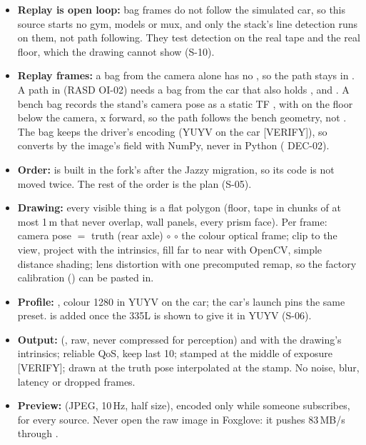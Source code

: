 \documentclass[11pt,a4paper]{article}
\begin{document}
\begin{itemize}
  \item \textbf{Replay is open loop:} bag frames do not follow the simulated car, so this source starts no gym, models or mux, and only the stack's line detection runs on them, not path following. They test detection on the real tape and the real floor, which the drawing cannot show (S-10).
  \item \textbf{Replay frames:} a bag from the camera alone has no , so the path stays in . A path in  (RASD OI-02) needs a bag from the car that also holds ,  and . A bench bag records the stand's camera pose as a static TF \arrowto{}, with  on the floor below the camera, x forward, so the path follows the bench geometry, not . The bag keeps the driver's encoding (YUYV on the car [VERIFY]), so  converts by the image's  field with NumPy, never  in Python ( DEC-02).
  \item \textbf{Order:}  is built in the fork's  after the Jazzy migration, so its code is not moved twice. The rest of the order is the  plan (S-05).
  \item \textbf{Drawing:} every visible thing is a flat polygon (floor, tape in chunks of at most 1\,m that never overlap, wall panels, every prism face). Per frame: camera pose $=$ truth (rear axle) $\circ$  $\circ$ the colour optical frame; clip to the view, project with the intrinsics, fill far to near with OpenCV, simple distance shading; lens distortion with one precomputed remap, so the factory calibration () can be pasted in.
  \item \textbf{Profile:} , colour 1280 in YUYV on the car; the car's launch pins the same preset.  is added once the 335L is shown to give it in YUYV (S-06).
  \item \textbf{Output:}  (, raw, never compressed for perception) and  with the drawing's intrinsics; reliable QoS, keep last 10; stamped at the middle of exposure [VERIFY]; drawn at the truth pose interpolated at the stamp. No noise, blur, latency or dropped frames.
  \item \textbf{Preview:}  (JPEG, 10\,Hz, half size), encoded only while someone subscribes, for every source. Never open the raw image in Foxglove: it pushes 83\,MB/s through .

\end{itemize}
\end{document}
